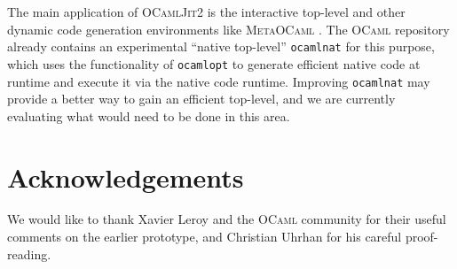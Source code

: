 \documentclass[12pt,a4paper,final]{article}
\begin{document}
The main application of \textsc{OCamlJit2} is the interactive top-level and other
dynamic code generation environments like \textsc{MetaOCaml} \cite{Taha06}. The
\textsc{OCaml} repository already contains an experimental ``native top-level''
\texttt{ocamlnat} for this purpose, which uses the functionality of \texttt{ocamlopt}
to generate efficient native code at runtime and execute it via the native code
runtime. Improving \texttt{ocamlnat} may provide a better way to gain an efficient
top-level, and we are currently evaluating what would need to be done in this
area.


\section*{Acknowledgements}

We would like to thank Xavier Leroy and the \textsc{OCaml} community for their
useful comments on the earlier prototype, and Christian Uhrhan for his careful
proof-reading.




\end{document}
